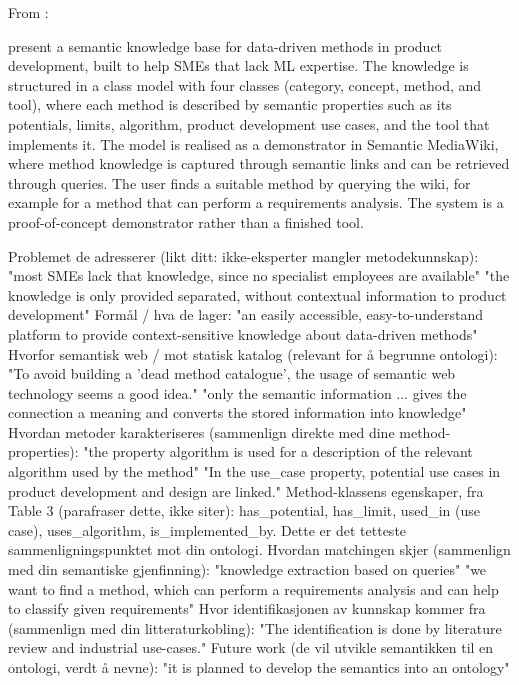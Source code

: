 From \parencite{gerschutz2021semantic_web_approach} :

\textcite{gerschutz2021semantic_web_approach} present a semantic knowledge base 
for data-driven methods in product development, built to 
help SMEs that lack ML expertise. The knowledge is 
structured in a class model with four classes (category, 
concept, method, and tool), where each method is described 
by semantic properties such as its potentials, limits, 
algorithm, product development use cases, and the tool that 
implements it. The model is realised as a demonstrator in 
Semantic MediaWiki, where method knowledge is captured 
through semantic links and can be retrieved through queries. 
The user finds a suitable method by querying the wiki, for 
example for a method that can perform a requirements 
analysis. The system is a proof-of-concept demonstrator 
rather than a finished tool.

Problemet de adresserer (likt ditt: ikke-eksperter mangler metodekunnskap):
"most SMEs lack that knowledge, since no specialist employees are available"
"the knowledge is only provided separated, without contextual information to product development"
Formål / hva de lager:
"an easily accessible, easy-to-understand platform to provide context-sensitive knowledge about data-driven methods"
Hvorfor semantisk web / mot statisk katalog (relevant for å begrunne ontologi):
"To avoid building a 'dead method catalogue', the usage of semantic web technology seems a good idea."
"only the semantic information ... gives the connection a meaning and converts the stored information into knowledge"
Hvordan metoder karakteriseres (sammenlign direkte med dine method-properties):
"the property algorithm is used for a description of the relevant algorithm used by the method"
"In the use_case property, potential use cases in product development and design are linked."
Method-klassens egenskaper, fra Table 3 (parafraser dette, ikke siter): has_potential, has_limit, used_in (use case), uses_algorithm, is_implemented_by. Dette er det tetteste sammenligningspunktet mot din ontologi.
Hvordan matchingen skjer (sammenlign med din semantiske gjenfinning):
"knowledge extraction based on queries"
"we want to find a method, which can perform a requirements analysis and can help to classify given requirements"
Hvor identifikasjonen av kunnskap kommer fra (sammenlign med din litteraturkobling):
"The identification is done by literature review and industrial use-cases."
Future work (de vil utvikle semantikken til en ontologi, verdt å nevne):
"it is planned to develop the semantics into an ontology"



